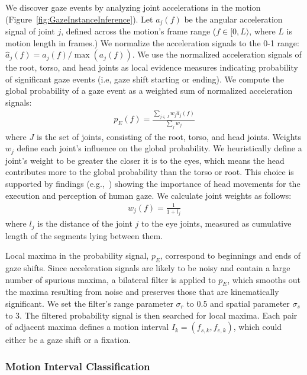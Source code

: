 We discover gaze events by analyzing joint accelerations in the motion (Figure~\ref{fig:GazeInstanceInference}). Let $a_j(f)$ be the angular acceleration signal of joint $j$, defined across the motion's frame range ($f \in [0, L\rangle$, where $L$ is motion length in frames.) We normalize the acceleration signals to the 0-1 range: $\hat{a}_j(f) = a_j(f) / \mathop{max}(a_j(f))$. We use the normalized acceleration signals of the root, torso, and head joints as local evidence measures indicating probability of significant gaze events (i.e, gaze shift starting or ending). We compute the global probability of a gaze event as a weighted sum of normalized acceleration signals:
%
\begin{align} \label{eq:GazeEventProbability}
p_E(f) = \frac{\sum_{j \in J} w_j \hat{a}_j(f)}{\sum_j w_j}
\end{align}
%
where $J$ is the set of joints, consisting of the root, torso, and head joints. Weights $w_j$ define each joint's influence on the global probability. We heuristically define a joint's weight to be greater the closer it is to the eyes, which means the head contributes more to the global probability than the torso or root. This choice is supported by findings (e.g.,~\citep{hietanen1999does}) showing the importance of head movements for the execution and perception of human gaze. We calculate joint weights as follows:
%
\begin{align} \label{eq:GazeJointWeight}
w_j(f) = \frac{1}{1 + l_j}
\end{align}
%
where $l_j$ is the distance of the joint $j$ to the eye joints, measured as cumulative length of the segments lying between them.

Local maxima in the probability signal, $p_E$, correspond to beginnings and ends of gaze shifts. Since acceleration signals are likely to be noisy and contain a large number of spurious maxima, a bilateral filter is applied to $p_E$, which smooths out the maxima resulting from noise and preserves those that are kinematically significant. We set the filter's range parameter $\sigma_r$ to 0.5 and spatial parameter $\sigma_s$ to 3. The filtered probability signal is then searched for local maxima. Each pair of adjacent maxima defines a motion interval $I_k = (f_{s,k}, f_{e,k})$, which could either be a gaze shift or a fixation.

\subsubsection{Motion Interval Classification}

